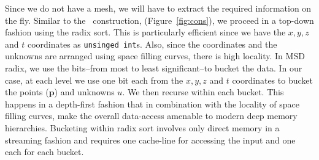 Since we do not have a mesh, we will have to extract the required information on the fly. Similar to the \stri\ construction, (Figure~\ref{fig:cons}), we proceed in a top-down fashion using the radix sort. This is particularly efficient since we have the $x,y,z$ and $t$ coordinates as \texttt{unsinged int}s. Also, since the coordinates and the unknowns are arranged using space filling curves, there is high locality. In MSD radix, we use the bits--from most to least significant--to bucket the data. In our case, at each level we use one bit each from the $x,y,z$ and $t$ coordinates to bucket the points ($\mathbf{p}$) and unknowns $u$. We then recurse within each bucket. This happens in a depth-first fashion that in combination with the locality of space filling curves, make the overall data-access amenable to modern deep memory hierarchies. Bucketing within radix sort involves only direct memory in a streaming fashion and requires one cache-line for accessing the input and one each for each bucket. 

